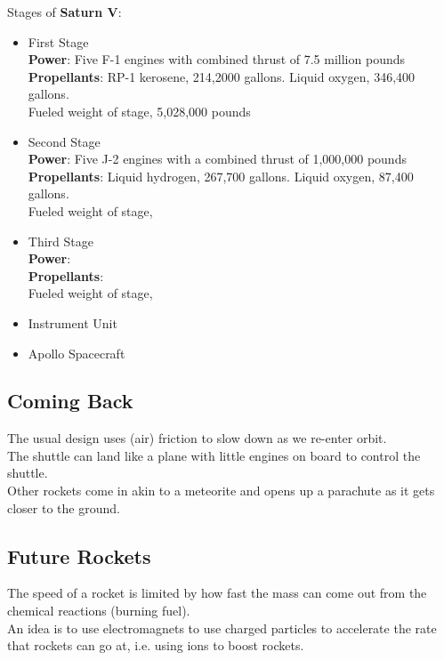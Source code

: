 \documentclass[12pt]{article}
\theoremstyle{definition}
\begin{document}
Stages of \textbf{Saturn V}:
\begin{itemize}
    \item First Stage \\
    \textbf{Power}: Five F-1 engines with combined thrust of 7.5 million pounds \\
    \textbf{Propellants}: RP-1 kerosene, 214,2000 gallons. Liquid oxygen, 346,400 gallons. \\
    Fueled weight of stage, 5,028,000 pounds

    \item Second Stage \\
    \textbf{Power}: Five J-2 engines with a combined thrust of 1,000,000 pounds \\
    \textbf{Propellants}: Liquid hydrogen, 267,700 gallons. Liquid oxygen, 87,400 gallons. \\
    Fueled weight of stage,

    \item Third Stage \\
    \textbf{Power}:  \\
    \textbf{Propellants}:  \\
    Fueled weight of stage,

    \item Instrument Unit

    \item Apollo Spacecraft
\end{itemize}

\subsection{Coming Back}
The usual design uses (air) friction to slow down as we re-enter orbit. \\
The shuttle can land like a plane with little engines on board to control the shuttle. \\
Other rockets come in akin to a meteorite and opens up a parachute as it gets closer to the ground.

\subsection{Future Rockets}
The speed of a rocket is limited by how fast the mass can come out from the chemical reactions (burning fuel). \\
An idea is to use electromagnets to use charged particles to accelerate the rate that rockets can go at, i.e. using ions to boost rockets.

\clearpage
\printindex
\end{document}
